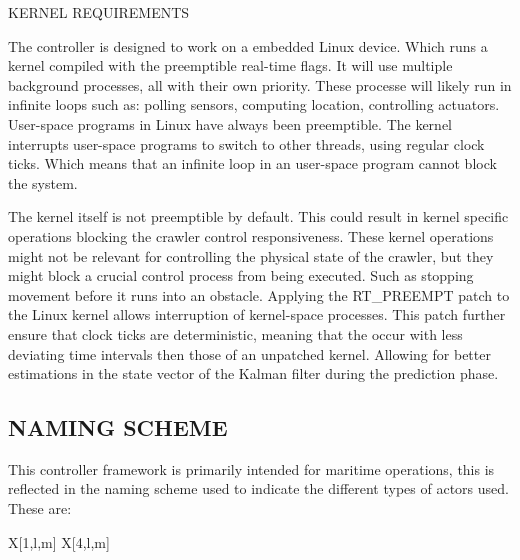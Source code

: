 \begin{RoyalNote}[label=Kernel_req]{KERNEL REQUIREMENTS}

    The controller is designed to work on a embedded Linux device. Which runs a kernel compiled with the preemptible
    real-time flags. It will use multiple background processes, all with their own priority. These processe will 
	likely run
    in infinite loops such as: polling sensors, computing location, controlling actuators. User-space programs in 
	Linux have
    always been preemptible. The kernel interrupts user-space programs to switch to other threads, using regular clock
    ticks. Which means that an infinite loop in an user-space program cannot block the system.

    The kernel itself is not preemptible by default. This could result in kernel specific operations blocking the 
	crawler
    control responsiveness. These kernel operations might not be relevant for controlling the physical state of the 
	crawler,
    but they might block a crucial control process from being executed. Such as stopping movement before it runs into an
    obstacle. Applying the RT\_PREEMPT patch to the Linux kernel allows interruption of kernel-space processes. This 
	patch
    further ensure that clock ticks are deterministic, meaning that the occur with less deviating time intervals then
	those
    of an unpatched kernel. Allowing for better estimations in the state vector of the Kalman filter during the 
	prediction
    phase.

\end{RoyalNote}

\subsection{NAMING SCHEME}\label{sec:naming scheme}

\noindent This controller framework is primarily intended for maritime operations, this is reflected in the naming 
scheme used to
indicate the different types of actors used. These are:

\begin{RoyalTable}{X[1,l,m] X[4,l,m]}
\end{RoyalTable}

